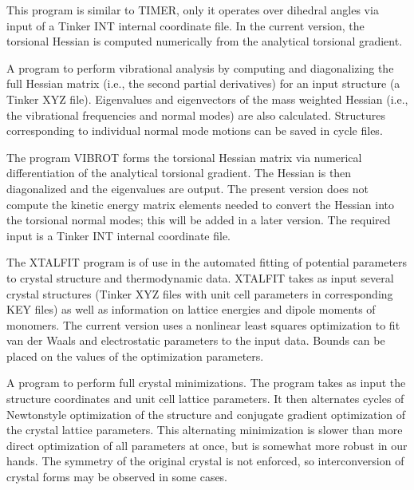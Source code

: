 \documentclass[letterpaper,11pt,english]{sphinxmanual}
\begin{document}

This program is similar to TIMER, only it operates over dihedral angles via input of a Tinker INT internal coordinate file. In the current version, the torsional Hessian is computed numerically from the analytical torsional gradient.


A program to perform vibrational analysis by computing and diagonalizing the full Hessian matrix (i.e., the second partial derivatives) for an input structure (a Tinker XYZ file). Eigenvalues and eigenvectors of the mass weighted Hessian (i.e., the vibrational frequencies and normal modes) are also calculated. Structures corresponding to individual normal mode motions can be saved in cycle files.


The program VIBROT forms the torsional Hessian matrix via numerical differentiation of the analytical torsional gradient. The Hessian is then diagonalized and the eigenvalues are output. The present version does not compute the kinetic energy matrix elements needed to convert the Hessian into the torsional normal modes; this will be added in a later version. The required input is a Tinker INT internal coordinate file.


The XTALFIT program is of use in the automated fitting of potential parameters to crystal structure and thermodynamic data. XTALFIT takes as input several crystal structures (Tinker XYZ files with unit cell parameters in corresponding KEY files) as well as information on lattice energies and dipole moments of monomers. The current version uses a nonlinear least squares optimization to fit van der Waals and electrostatic parameters to the input data. Bounds can be placed on the values of the optimization parameters.


A program to perform full crystal minimizations. The program takes as input the structure coordinates and unit cell lattice parameters. It then alternates cycles of Newton\sphinxhyphen{}style optimization of the structure and conjugate gradient optimization of the crystal lattice parameters. This alternating minimization is slower than more direct optimization of all parameters at once, but is somewhat more robust in our hands. The symmetry of the original crystal is not enforced, so interconversion of crystal forms may be observed in some cases.
\end{document}
